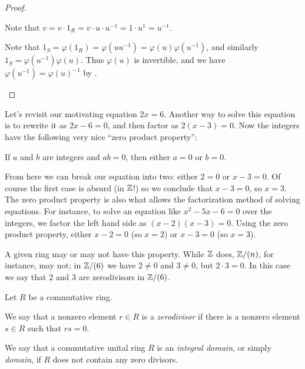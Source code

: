 \begin{proof}
\begin{inlineproplist}
\item Note that \(v = v \cdot 1_R = v \cdot u \cdot u^{-1} = 1 \cdot u^{1} = u^{-1}\).
\item Note that \(1_S = \varphi(1_R) = \varphi(uu^{-1}) = \varphi(u)\varphi(u^{-1})\), and similarly \(1_S = \varphi(u^{-1})\varphi(u)\).
Thus \(\varphi(u)\) is invertible, and we have \(\varphi(u^{-1}) = \varphi(u)^{-1}\) by .
\end{inlineproplist}
\end{proof}

Let's revisit our motivating equation \(2x = 6\).
Another way to solve this equation is to rewrite it as \(2x - 6 = 0\), and then factor as \(2(x-3) = 0\).
Now the integers have the following very nice ``zero product property'':
\begin{center}
If \(a\) and \(b\) are integers and \(ab = 0\), then either \(a = 0\) or \(b = 0\).
\end{center}
From here we can break our equation into two: either \(2 = 0\) or \(x - 3 = 0\).
Of course the first case is absurd (in \(\mathbb{Z}\)!) so we conclude that \(x - 3 = 0\), so \(x = 3\).
The zero product property is also what allows the factorization method of solving equations.
For instance, to solve an equation like \(x^2 - 5x - 6 = 0\) over the integers, we factor the left hand side as \((x-2)(x-3) = 0\).
Using the zero product property, either \(x-2 = 0\) (so \(x = 2\)) or \(x-3 = 0\) (so \(x = 3\)).

A given ring may or may not have this property.
While \(\mathbb{Z}\) does, \(\mathbb{Z}/(n)\), for instance, may not; in \(\mathbb{Z}/(6)\) we have \(2 \neq 0\) and \(3 \neq 0\), but \(2 \cdot 3 = 0\).
In this case we say that \(2\) and \(3\) are zerodivisors in \(\mathbb{Z}/(6)\).

\begin{dfn}[Zerodivisor] \label{dfn:zerodivisor-domain}
Let \(R\) be a commutative ring.
\begin{proplist}
\item We say that a nonzero element \(r \in R\) is a \emph{zerodivisor} if there is a nonzero element \(s \in R\) such that \(rs = 0\).
\item We say that a commutative unital ring \(R\) is an \emph{integral domain}, or simply \emph{domain}, if \(R\) does not contain any zero divisors.
\end{proplist}
\end{dfn}

